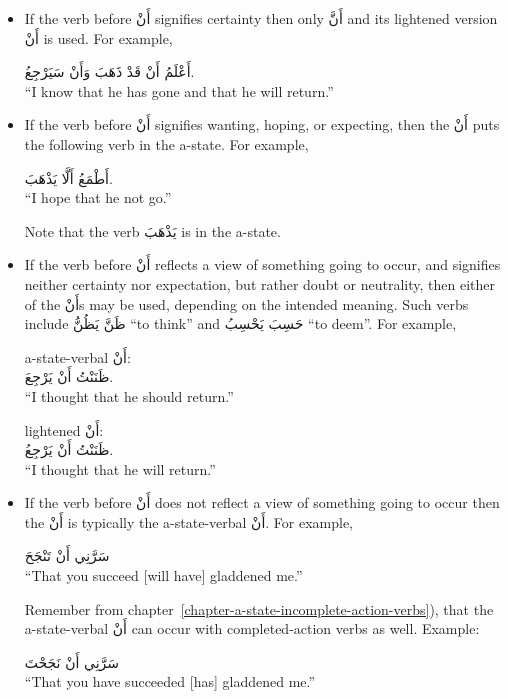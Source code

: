 \documentclass[
  10pt,
]{book}
\begin{document}
\begin{itemize}
\item
  If the verb before \foreignlanguage{arabic}{أَنْ} signifies certainty then only \foreignlanguage{arabic}{أَنَّ} and its lightened version \foreignlanguage{arabic}{أَنْ} is used. For example,

  \foreignlanguage{arabic}{أَعْلَمُ أَنْ قَدْ ذَهَبَ وَأَنْ سَيَرْجِعُ.}\\
  \enquote{I know that he has gone and that he will return.}
\item
  If the verb before \foreignlanguage{arabic}{أَنْ} signifies wanting, hoping, or expecting, then the \foreignlanguage{arabic}{أَنْ} puts the following verb in the a-state. For example,

  \foreignlanguage{arabic}{أَطْمَعُ أَلَّا يَذْهَبَ.}\\
  \enquote{I hope that he not go.}

  Note that the verb \foreignlanguage{arabic}{يَذْهَبَ} is in the a-state.
\item
  If the verb before \foreignlanguage{arabic}{أَنْ} reflects a view of something going to occur, and signifies neither certainty nor expectation, but rather doubt or neutrality, then either of the \foreignlanguage{arabic}{أَنْ}s may be used, depending on the intended meaning. Such verbs include \foreignlanguage{arabic}{ظَنَّ يَظُنُّ} \enquote{to think} and \foreignlanguage{arabic}{حَسِبَ يَحْسِبُ} \enquote{to deem}. For example,

  a-state-verbal \foreignlanguage{arabic}{أَنْ}:\\
  \foreignlanguage{arabic}{ظَنَنْتُ أَنْ يَرْجِعَ.}\\
  \enquote{I thought that he should return.}

  lightened \foreignlanguage{arabic}{أَنْ}:\\
  \foreignlanguage{arabic}{ظَنَنْتُ أَنْ يَرْجِعُ.}\\
  \enquote{I thought that he will return.}
\item
  If the verb before \foreignlanguage{arabic}{أَنْ} does not reflect a view of something going to occur then the \foreignlanguage{arabic}{أَنْ} is typically the a-state-verbal \foreignlanguage{arabic}{أَنْ}. For example,

  \foreignlanguage{arabic}{سَرَّنِي أَنْ تَنْجَحَ}\\
  \enquote{That you succeed {[}will have{]} gladdened me.}

  Remember from chapter~\ref{chapter-a-state-incomplete-action-verbs}), that the a-state-verbal \foreignlanguage{arabic}{أَنْ} can occur with completed-action verbs as well. Example:

  \foreignlanguage{arabic}{سَرَّنِي أَنْ نَجَحْتَ}\\
  \enquote{That you have succeeded {[}has{]} gladdened me.}
\end{itemize}
\end{document}
